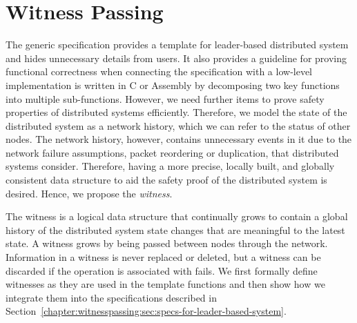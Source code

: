 \section{Witness Passing}
\label{chapter:witnesspassing:sec:witness-passing}
The generic specification provides a template for leader-based distributed
system and hides unnecessary details from users. It also provides a guideline 
for proving functional correctness when connecting the specification with a 
low-level implementation is written in C or Assembly by decomposing 
two key functions into multiple sub-functions.
However, we need further items to prove safety properties of distributed systems efficiently.  
Therefore, we model the state of the distributed system as a network history, 
which we can refer to the status of other nodes.
The network history, however, contains unnecessary events in it due to
the network failure assumptions, packet reordering or duplication, that distributed systems consider. Therefore, having a more precise, 
locally built, and globally consistent data structure to aid the safety proof of the distributed system is desired. Hence, we propose the \textit{witness}.

The witness is a logical data structure that continually grows to contain a global
history of the distributed system state changes that are meaningful to the
latest state. A witness grows by being passed between nodes through the network.
Information in a witness is never replaced or deleted, but a witness can be discarded if the operation is associated with fails.
We first formally define witnesses as they are used in the template functions
and then show how we integrate them into the specifications described in Section~\ref{chapter:witnesspassing:sec:specs-for-leader-based-system}.



